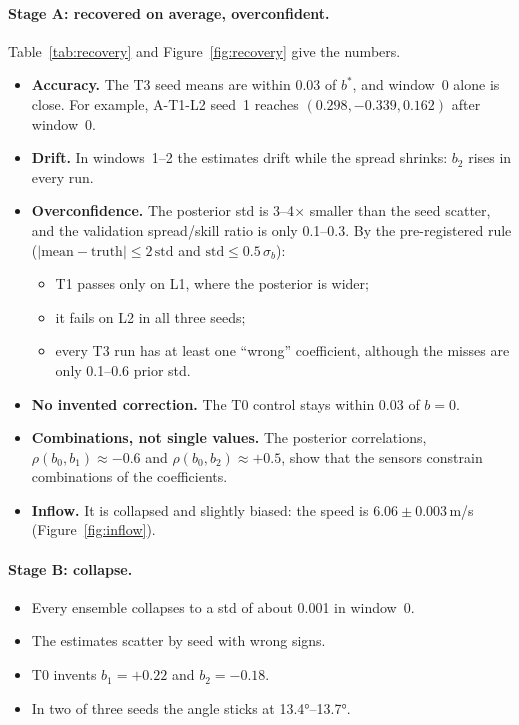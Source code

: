 \documentclass[11pt,a4paper]{article}
\newcommand{\bstar}{\ensuremath{b^\ast}}
\begin{document}
\paragraph{Stage A: recovered on average, overconfident.}
Table~\ref{tab:recovery} and Figure~\ref{fig:recovery} give the numbers.
\begin{itemize}
\item \textbf{Accuracy.} The T3 seed means are within 0.03 of \bstar, and
  window~0 alone is close. For example, A-T1-L2 seed~1 reaches
  $(0.298,-0.339,0.162)$ after window~0.
\item \textbf{Drift.} In windows~1--2 the estimates drift while the spread
  shrinks: $b_2$ rises in every run.
\item \textbf{Overconfidence.} The posterior std is 3--4$\times$ smaller
  than the seed scatter, and the validation spread/skill ratio is only
  0.1--0.3. By the pre-registered rule
  ($|\text{mean}-\text{truth}|\le2\,\text{std}$ and
  $\text{std}\le0.5\,\sigma_b$):
  \begin{itemize}
  \item T1 passes only on L1, where the posterior is wider;
  \item it fails on L2 in all three seeds;
  \item every T3 run has at least one ``wrong'' coefficient, although the
    misses are only 0.1--0.6 prior std.
  \end{itemize}
\item \textbf{No invented correction.} The T0 control stays within 0.03 of
  $b=0$.
\item \textbf{Combinations, not single values.} The posterior correlations,
  $\rho(b_0,b_1)\approx-0.6$ and $\rho(b_0,b_2)\approx+0.5$, show that the
  sensors constrain combinations of the coefficients.
\item \textbf{Inflow.} It is collapsed and slightly biased: the speed is
  $6.06\pm0.003$\,m/s (Figure~\ref{fig:inflow}).
\end{itemize}

\paragraph{Stage B: collapse.}
\begin{itemize}
\item Every ensemble collapses to a std of about 0.001 in window~0.
\item The estimates scatter by seed with wrong signs.
\item T0 invents $b_1=+0.22$ and $b_2=-0.18$.
\item In two of three seeds the angle sticks at \ang{13.4}--\ang{13.7}.
\end{itemize}
\end{document}
